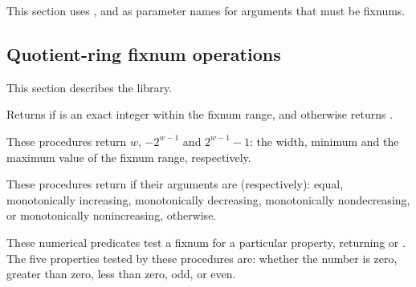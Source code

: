 This section uses ,  and  as parameter
names for arguments that must be fixnums.

\subsection{Quotient-ring fixnum operations}

This section describes the  library.

\begin{entry}{%
}

Returns \schtrue{} if  is an exact
integer within the fixnum range, and
otherwise returns \schfalse{}.
\end{entry}

\begin{entry}{%
}

These procedures return $w$,
$-2^{w-1}$ and $2^{w-1} - 1$: the
width, minimum and the maximum value of the fixnum range, respectively.
\end{entry}

\begin{entry}{%
}

These procedures return \schtrue{} if their arguments are (respectively):
equal, monotonically increasing, monotonically decreasing,
monotonically nondecreasing, or monotonically nonincreasing,
\schfalse{} otherwise.
\end{entry}

\begin{entry}{%
}

These numerical predicates test a fixnum for a particular property,
returning \schtrue{} or \schfalse{}.  The five properties tested by
these procedures are: whether the number is zero, greater than zero,
less than zero, odd, or even.
\end{entry}

